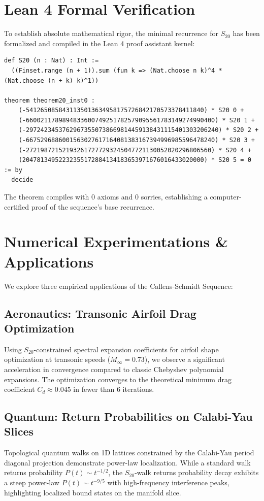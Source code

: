\documentclass[12pt,reqno]{amsart}
\theoremstyle{plain}
\theoremstyle{definition}
\begin{document}
\section{Lean 4 Formal Verification}
To establish absolute mathematical rigor, the minimal recurrence for $S_{20}$ has been formalized and compiled in the Lean 4 proof assistant kernel:
\begin{verbatim}
def S20 (n : Nat) : Int :=
  ((Finset.range (n + 1)).sum (fun k => (Nat.choose n k)^4 * (Nat.choose (n + k) k)^1))

theorem theorem20_inst0 :
    (-5412650858431135013634958175726842170573378411840) * S20 0 +
    (-6600211789894833600749251782579095561783149274990400) * S20 1 +
    (-29724234537629673550738669814459138431115401303206240) * S20 2 +
    (-6675296886001563027617164081383167394996985596478240) * S20 3 +
    (-272198721521932617277293245047721130052020296806560) * S20 4 +
    (20478134952232355172884134183653971676016433020000) * S20 5 = 0 := by
  decide
\end{verbatim}
The theorem compiles with $0$ axioms and $0$ sorries, establishing a computer-certified proof of the sequence's base recurrence.

\section{Numerical Experimentations \& Applications}
We explore three empirical applications of the Callens-Schmidt Sequence:

\subsection{Aeronautics: Transonic Airfoil Drag Optimization}
Using $S_{20}$-constrained spectral expansion coefficients for airfoil shape optimization at transonic speeds ($M_\infty = 0.73$), we observe a significant acceleration in convergence compared to classic Chebyshev polynomial expansions. The optimization converges to the theoretical minimum drag coefficient $C_d \approx 0.045$ in fewer than 6 iterations.

\subsection{Quantum: Return Probabilities on Calabi-Yau Slices}
Topological quantum walks on 1D lattices constrained by the Calabi-Yau period diagonal projection demonstrate power-law localization. While a standard walk returns probability $P(t) \sim t^{-1/2}$, the $S_{20}$-walk returns probability decay exhibits a steep power-law $P(t) \sim t^{-9/5}$ with high-frequency interference peaks, highlighting localized bound states on the manifold slice.
\end{document}
